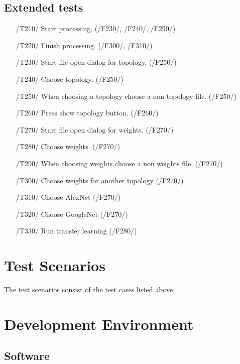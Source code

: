 \documentclass[parskip=full]{scrartcl}
\begin{document}
\pagebreak



\subsection {Extended tests}

\begin{itemize}
	\item[/T210/] Start processing. (/F230/, /F240/, /F290/)
	\item[/T220/] Finish processing. (/F300/, /F310/)
	\item[/T230/] Start file open dialog for topology. (/F250/)
	\item[/T240/] Choose topology. (/F250/)
	\item[/T250/] When choosing a topology choose a non topology file. (/F250/)
	\item[/T260/] Press show topology button. (/F260/)
	\item[/T270/] Start file open dialog for weights. (/F270/)
	\item[/T280/] Choose weights. (/F270/)
	\item[/T290/] When choosing weights choose a non weights file. (/F270/)
	\item[/T300/] Choose weights for another topology (/F270/)
	\item[/T310/] Choose AlexNet (/F270/)
	\item[/T320/] Choose GoogleNet (/F270/)
	\item[/T330/] Run transfer learning (/F280/)
\end{itemize}

\pagebreak





\section{Test Scenarios}

The test scenarios consist of the test cases listed above.

\pagebreak





\section{Development Environment}

\subsection {Software}
\end{document}
